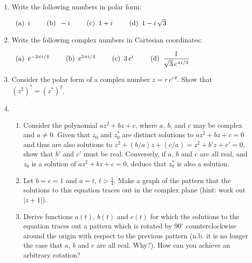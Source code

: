 \documentclass[12pt]{article}
\begin{document}
\begin{enumerate}
\item Write the following numbers in polar form:

$\begin{array}[h!]{l}
{\rm (a)}\hskip5pt i\hskip24pt
{\rm (b)}\hskip5pt -i\hskip24pt
{\rm (c)}\hskip5pt 1+i\hskip24pt
{\rm (d)}\hskip5pt 1-i\,\sqrt{3}\hskip24pt
\end{array}
$

\item Write the following complex numbers in Cartesian coordinates:

$\begin{array}[h!]{l}
{\rm (a)}\hskip5pt e^{-3\pi i/4}\hskip24pt
{\rm (b)}\hskip5pt e^{5\pi i/4}\hskip24pt
{\rm (c)}\hskip5pt 3\,e^{i}\hskip24pt
{\rm (d)}\hskip5pt \displaystyle{1\over\sqrt{3}\,e^{\pi i/3}}\hskip24pt
\end{array}
$

\item Consider the polar form of a complex number $z=r\,e^{i\,\theta}$.  Show that
$(z^2)^\ast=(z^\ast)^2$.

\item
\begin{enumerate}
\item Consider the polynomial $az^2+bz+c$, where $a$, $b$,
  and $c$ may be complex and $a\ne 0$. Given that $z_0$ and $z_0^\ast$ are distinct solutions to
$az^2 + bz + c = 0$ and thus are also solutions to $z^2+(b/a)z+(c/a)=z^2+b'z+c'=0$, show that $b'$ and $c'$ must be real.
  Conversely, if $a$, $b$ and $c$ are all real, and $z_0$ is a solution of $az^2 + bz + c = 0$, deduce that $z_0^\ast$ is also a solution.

\item Let $b=c=1$ and $a=t$, $t>\frac{1}{4}$. Make a graph of the
  pattern that the solutions to this equation traces out in the
  complex plane (hint: work out $|z+1|$).

\item Derive functions $a(t)$, $b(t)$ and $c(t)$ for which
  the solutions to the equation traces out a pattern which is rotated
  by $90^\circ$ counterclockwise around the origin with respect to the previous
  pattern (n.b. it is no longer the case that $a$, $b$ and $c$ are all real. Why?).
  How can you achieve an arbitrary rotation?
\end{enumerate}
\end{enumerate}
\end{document}
